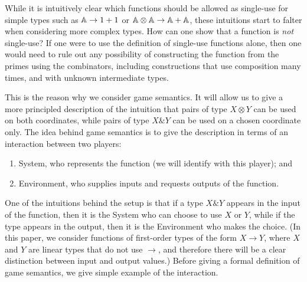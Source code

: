\documentclass[a4paper,UKenglish,cleveref, autoref, numberwithinsect, thm-restate]{lipics-v2021}
\begin{document}
While it is intuitively clear which functions should be allowed as single-use for simple types such as $\mathbb A \to 1+1$ or $\mathbb A \otimes \mathbb A \to \mathbb A + \mathbb A$, these intuitions start to falter when considering more complex types. How can one show that a function is \emph{not} single-use? If one were to use the definition of single-use functions alone, then one would need to rule out any possibility of constructing the function from the primes using the combinators, including constructions that use composition many times, and with unknown intermediate types. 

This is the reason why we consider game semantics. It will allow us to give  a more principled description of the intuition that pairs of type $X \otimes Y$ can be used on both coordinates, while pairs of type $X \& Y$ can be used on a chosen coordinate only. The idea behind game semantics is to give the description in terms of an interaction between two players:
\begin{enumerate}
    \item System, who represents the function (we will identify with this player); and
    \item Environment, who supplies inputs and requests outputs of the function.
\end{enumerate}
One of the intuitions behind the setup is that if a type $X \& Y$ appears in the input of the function, then it is the System who can choose to use $X$ or $Y$, while if the type appears in the output, then it is the Environment who makes the choice. (In this paper, we consider functions of first-order types of the form $X \to Y$, where $X$ and $Y$ are linear types that do not use $\to$, and therefore there will be a clear distinction between input and output values.)
Before giving a formal definition of game semantics, we give simple example of the interaction.
\end{document}
